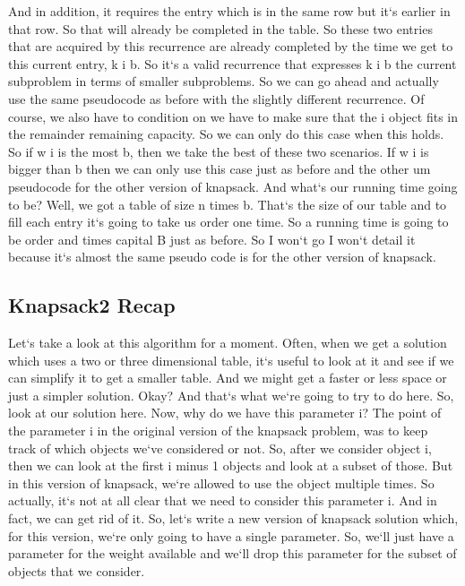 And in addition, it requires the entry which is in the same row but it`s earlier in that row.
So that will already be completed in the table.
So these two entries that are acquired by this recurrence are already completed by the time we get to this current entry, k i b.
So it`s a valid recurrence that expresses k i b the current subproblem in terms of smaller subproblems.
So we can go ahead and actually use the same pseudocode as before with the slightly different recurrence.
Of course, we also have to condition on we have to make sure that the i object fits in the remainder remaining capacity.
So we can only do this case when this holds.
So if w i is the most b, then we take the best of these two scenarios.
If w i is bigger than b then we can only use this case just as before and the other um pseudocode for the other version of knapsack.
And what`s our running time going to be? Well, we got a table of size n times b.
That`s the size of our table and to fill each entry it`s going to take us order one time.
So a running time is going to be order and times capital B just as before.
So I won`t go I won`t detail it because it`s almost the same pseudo code is for the other version of knapsack.

\subsection{Knapsack2  Recap}
Let`s take a look at this algorithm for a moment.
Often, when we get a solution which uses a two or three dimensional table, it`s useful to look at it and see if we can simplify it to get a smaller table.
And we might get a faster or less space or just a simpler solution.
Okay? And that`s what we`re going to try to do here.
So, look at our solution here.
Now, why do we have this parameter i? The point of the parameter i in the original version of the knapsack problem, was to keep track of which objects we`ve considered or not.
So, after we consider object i, then we can look at the first i minus 1 objects and look at a subset of those.
But in this version of knapsack, we`re allowed to use the object multiple times.
So actually, it`s not at all clear that we need to consider this parameter i.
And in fact, we can get rid of it.
So, let`s write a new version of knapsack solution which, for this version, we`re only going to have a single parameter.
So, we`ll just have a parameter for the weight available and we`ll drop this parameter for the subset of objects that we consider.

